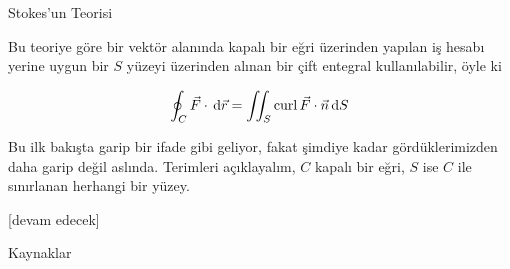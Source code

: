 \documentclass[12pt,fleqn]{article}\usepackage{../../common}
\begin{document}
Stokes'un Teorisi

Bu teoriye göre bir vektör alanında kapalı bir eğri üzerinden yapılan iş hesabı
yerine uygun bir $S$ yüzeyi üzerinden alınan bir çift entegral kullanılabilir,
öyle ki

$$
\oint_C \vec{F} \cdot \,\mathrm{d} \vec{r} =
\iint_S \operatorname{curl} \vec{F} \cdot \vec{n} \,\mathrm{d} S
$$

Bu ilk bakışta garip bir ifade gibi geliyor, fakat şimdiye kadar
gördüklerimizden daha garip değil aslında. Terimleri açıklayalım, $C$ kapalı bir
eğri, $S$ ise $C$ ile sınırlanan herhangi bir yüzey.













[devam edecek]

Kaynaklar
\end{document}
